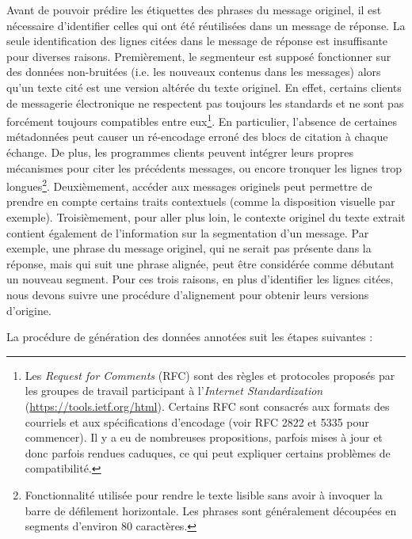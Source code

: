 Avant de pouvoir prédire les étiquettes des phrases du message originel, il est nécessaire d'identifier celles qui ont été réutilisées dans un message de réponse. La seule identification des lignes citées dans le message de réponse est insuffisante pour diverses raisons. Premièrement, le segmenteur est supposé fonctionner sur des données non-bruitées (i.e. les nouveaux contenus dans les messages) alors qu'un texte cité est une version altérée du texte originel. En effet, certains clients de messagerie électronique ne respectent pas toujours les standards et ne sont pas forcément toujours compatibles entre eux\footnote{Les \textit{Request for Comments} (RFC) sont des règles et protocoles proposés par les groupes de travail participant à l'\textit{Internet Standardization} (\url{https://tools.ietf.org/html}). Certains RFC sont consacrés aux formats des courriels et aux spécifications d'encodage (voir RFC 2822 et 5335 pour commencer). Il y a eu de nombreuses propositions, parfois mises à jour et donc parfois rendues caduques, ce qui peut expliquer certains problèmes de compatibilité.}. En particulier, l'absence de certaines métadonnées peut causer un ré-encodage erroné des blocs de citation à chaque échange. De plus, les programmes clients peuvent intégrer leurs propres mécanismes pour citer les précédents messages, ou encore tronquer les lignes trop longues\footnote{Fonctionnalité utilisée pour rendre le texte lisible sans avoir à invoquer la barre de défilement horizontale. Les phrases sont généralement découpées en segments d'environ 80 caractères.}. Deuxièmement, accéder aux messages originels peut permettre de prendre en compte certains traits contextuels (comme la disposition visuelle par exemple). Troisièmement, pour aller plus loin, le contexte originel du texte extrait contient également de l'information sur la segmentation d'un message. Par exemple, une phrase du message originel, qui ne serait pas présente dans la réponse, mais qui suit une phrase alignée, peut être considérée comme débutant un nouveau segment. Pour ces trois raisons, en plus d'identifier les lignes citées, nous devons suivre une procédure d'alignement pour obtenir leurs versions d'origine. 

La procédure de génération des données annotées suit les étapes suivantes :

